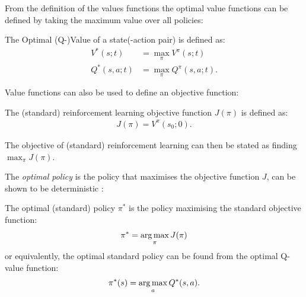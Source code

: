     From the definition of the values functions the optimal value functions can be defined by taking the maximum value over all policies:
    \begin{defn}
        \label{def:optimal_value}
        \label{def:optimal_q_value}
        The \textnormal{Optimal (Q-)Value} of a state(-action pair) is defined as:
        \begin{align}
            V^*(s;t) &= \max_{\pi} V^{\pi}(s;t) \label{eq:opt_value_fn_def} \\
            Q^*(s,a;t) &= \max_{\pi} Q^{\pi}(s,a;t). \label{eq:opt_q_value_fn_def}
        \end{align}
    \end{defn}

    Value functions can also be used to define an objective function:
    \begin{defn}
        \label{def:rl_obj_fn}
        The \textnormal{(standard) reinforcement learning objective function} $J(\pi)$ is defined as:
        \begin{align}
            J(\pi) = V^{\pi}(s_0;0). \label{eq:rl_obj_fn_def}
        \end{align}

        The objective of (standard) reinforcement learning can then be stated as finding $\max_{\pi} J(\pi)$.
    \end{defn}

    The \textit{optimal policy} is the policy that maximises the objective function $J$, can be shown to be deterministic  :
    \begin{defn}
        \label{def:opt_policy}
        The \textnormal{optimal (standard) policy} $\pi^*$ is the policy maximising the standard objective function:
        \begin{align}
            \pi^* = \operatorname*{arg\,max}_\pi J(\pi) \label{eq:opt_policy_def}
        \end{align}
        or equivalently, the optimal standard policy can be found from the optimal Q-value function:
        \begin{align}
            \pi^*(s) = \operatorname*{arg\,max}_a Q^*(s,a). \label{eq:opt_policy_from_opt_q_value}
        \end{align}
    \end{defn}


